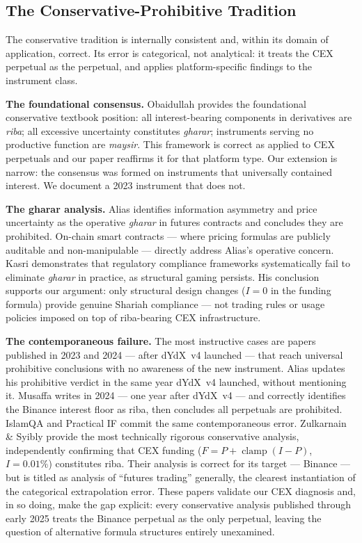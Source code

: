 \documentclass[10pt,twocolumn]{article}
\DeclareMathOperator{\clamp}{clamp}
\begin{document}
\subsection{The Conservative-Prohibitive Tradition}

The conservative tradition is internally consistent and, within its domain of
application, correct.
Its error is categorical, not analytical: it treats the CEX perpetual as the
perpetual, and applies platform-specific findings to the instrument class.

\textbf{The foundational consensus.}
Obaidullah \cite{Obaidullah2005} provides the foundational conservative textbook
position: all interest-bearing components in derivatives are \textit{riba}; all
excessive uncertainty constitutes \textit{gharar}; instruments serving no productive
function are \textit{maysir}.
This framework is correct as applied to CEX perpetuals and our paper reaffirms it
for that platform type.
Our extension is narrow: the consensus was formed on instruments that universally
contained interest. We document a 2023 instrument that does not.

\textbf{The gharar analysis.}
Alias \cite{Alias2015} identifies information asymmetry and price uncertainty as the
operative \textit{gharar} in futures contracts and concludes they are prohibited.
On-chain smart contracts --- where pricing formulas are publicly auditable and
non-manipulable --- directly address Alias's operative concern.
Kasri \cite{Kasri2016} demonstrates that regulatory compliance frameworks
systematically fail to eliminate \textit{gharar} in practice, as structural gaming
persists.
His conclusion supports our argument: only structural design changes ($I = 0$ in
the funding formula) provide genuine Shariah compliance --- not trading rules or
usage policies imposed on top of riba-bearing CEX infrastructure.

\textbf{The contemporaneous failure.}
The most instructive cases are papers published in 2023 and 2024 --- after
dYdX~v4 launched --- that reach universal prohibitive conclusions with no
awareness of the new instrument.
Alias \cite{Alias2023} updates his prohibitive verdict in the same year dYdX~v4
launched, without mentioning it.
Musaffa \cite{Musaffa2024} writes in 2024 --- one year after dYdX~v4 --- and
correctly identifies the Binance interest floor as riba, then concludes all
perpetuals are prohibited.
IslamQA \cite{IslamQA2023} and Practical IF \cite{PracticalIF2023} commit the
same contemporaneous error.
Zulkarnain \& Syibly \cite{Indonesian2024} provide the most technically rigorous
conservative analysis, independently confirming that CEX funding ($F = P + \clamp(I-P)$,
$I = 0.01\%$) constitutes riba.
Their analysis is correct for its target --- Binance --- but is titled as analysis
of ``futures trading'' generally, the clearest instantiation of the categorical
extrapolation error.
These papers validate our CEX diagnosis and, in so doing, make the gap
explicit: every conservative analysis published through early 2025 treats the
Binance perpetual as the only perpetual, leaving the question of alternative
formula structures entirely unexamined.
\end{document}
